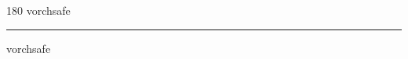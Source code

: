 
\begin{frame}
\begin{center}
\begin{turn}{180}
{\fontsize{2.5cm}{1em}\selectfont vorchsafe}
\end{turn}
\vspace{1em}\par  
\hrule
\vspace{1em}\par  
{\fontsize{2.5cm}{1em}\selectfont vorchsafe}
\end{center}
\end{frame}
